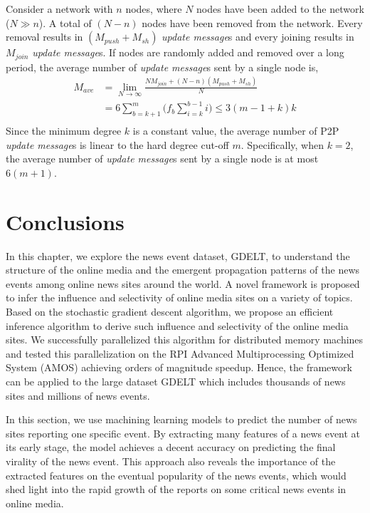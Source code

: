 Consider a network with $n$ nodes, where $N$ nodes have been added to the network ($N\gg n$). A total of $(N-n)$ nodes have been removed from the network. Every removal results in $(M_{push} + M_{sh})$ \textit{update message}s and every joining results in $M_{join}$ \textit{update message}s. If nodes are randomly added and removed over a long period, the average number of \textit{update message}s sent by a single node is,
\begin{equation}
\begin{array}{ll} 
 M_{ave} &= \lim_{N\to\infty} \frac{N M_{join} + (N-n)(M_{push} + M_{sh})}{N} \\
 &= 6 \sum_{b=k+1}^{m} \Big( f_b \sum_{i=k}^{b-1} i \Big) \leq 3(m - 1 + k)k\\
\end{array}
\end{equation}
Since the minimum degree $k$ is a constant value, the average number of P2P \textit{update message}s is linear to the hard degree cut-off $m$. Specifically, when $k=2$, the average number of \textit{update message}s sent by a single node is at most $6(m+1)$.

\section{Conclusions}

In this chapter, we explore the news event dataset, GDELT, to understand the structure of the online media and the emergent propagation patterns of the news events among online news sites around the world. A novel framework is proposed to infer the influence and selectivity of online media sites on a variety of topics. Based on the stochastic gradient descent algorithm, we propose an efficient inference algorithm to derive such influence and selectivity of the online media sites. We successfully parallelized this algorithm for distributed memory machines and tested this parallelization on the RPI Advanced Multiprocessing Optimized System (AMOS) achieving orders of magnitude speedup. Hence, the framework can be applied to the large dataset GDELT which includes thousands of news sites and millions of news events. 

In this section, we use machining learning models to predict the number of news sites reporting one specific event. By extracting many features of a news event at its early stage, the model achieves a decent accuracy on predicting the final virality of the news event. This approach also reveals the importance of the extracted features on the eventual popularity of the news events, which would shed light into the rapid growth of the reports on some critical news events in online media.

